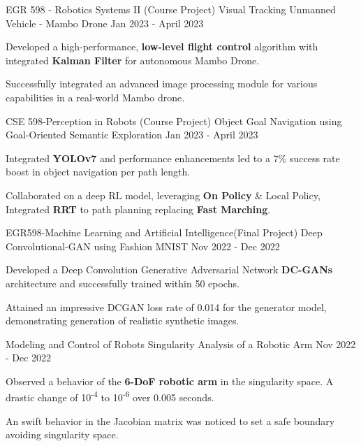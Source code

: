 \begin{cventries}
  \cventry
    {EGR 598 - Robotics Systems II (Course Project)} %
    {Visual Tracking Unmanned Vehicle - Mambo Drone} %
    { Jan 2023 - April 2023} %
    {} %
    {
      \begin{cvitems} %
        \item {Developed a high-performance, {\bf low-level flight control} algorithm with integrated {\bf Kalman Filter} for autonomous Mambo Drone.}
        \item {Successfully integrated an advanced image processing module for various capabilities in a real-world Mambo drone.}
      \end{cvitems}
    }
    

  \cventry
    {CSE 598-Perception in Robots (Course Project)} %
    {Object Goal Navigation using Goal-Oriented Semantic Exploration} %
    {Jan 2023 - April 2023} %
    {} %
    {
      \begin{cvitems} %
        \item {Integrated {\bf YOLOv7} and performance enhancements led to a 7\% success rate boost in object navigation per path length. }
        \item {Collaborated on a deep RL model, leveraging {\bf On Policy} \& Local Policy, Integrated {\bf RRT} to path planning replacing {\bf Fast Marching}.}
      \end{cvitems}
    }
    
  \cventry
    {EGR598-Machine Learning and Artificial Intelligence(Final Project)} %
    {Deep Convolutional-GAN using Fashion MNIST} %
    {Nov 2022 - Dec 2022} %
    {} %
    {
      \begin{cvitems} %
        \item {Developed a Deep Convolution Generative Adversarial Network {\bf DC-GANs} architecture and successfully trained within 50 epochs.}
        \item {Attained an impressive DCGAN loss rate of 0.014 for the generator model, demonstrating generation of realistic synthetic images.}
      \end{cvitems}
    }
    

  \cventry
    {Modeling and Control of Robots} %
    {Singularity Analysis of a Robotic Arm} %
    {Nov 2022 - Dec 2022} %
    {} %
    {
      \begin{cvitems} %
        \item {Observed a behavior of the {\bf 6-DoF robotic arm} in the singularity space. A drastic change of 10\textsuperscript{-4} to 10\textsuperscript{-6} over 0.005 seconds.}
        \item {An swift behavior in the Jacobian matrix was noticed to set a safe boundary avoiding singularity space.}
      \end{cvitems}
    }
    


\end{cventries}
